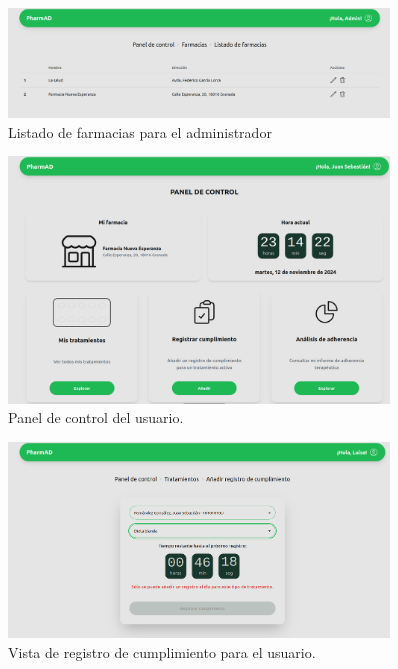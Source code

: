 \begin{figure}[h!]
	\centering
	\includegraphics[width=0.9\textwidth]{imagenes/listafarmacias.png}
	\caption{Listado de farmacias para el administrador}
\end{figure}

\begin{figure}[h!]
	\centering
	\includegraphics[width=0.9\textwidth]{imagenes/user.png}
	\caption{Panel de control del usuario.}
\end{figure}


\begin{figure}[h!]
	\centering
	\includegraphics[width=0.9\textwidth]{imagenes/registro.png}
	\caption{Vista de registro de cumplimiento para el usuario.}
\end{figure}

